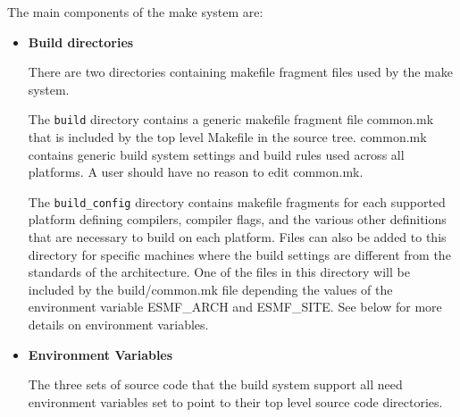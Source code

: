 The main components of the make system are:
\begin{itemize}
\item{{\bf Build directories}}

There are two directories containing makefile fragment files used by
the make system.  

The {\tt build} directory contains a generic makefile fragment file
common.mk that is included by the top level Makefile in the source
tree.  common.mk contains generic build system settings and build
rules used across all platforms.  A user should have no reason to edit
common.mk.

The {\tt build\_config} directory contains makefile fragments for each
supported platform defining compilers, compiler flags, and the various
other definitions that are necessary to build on each platform.  Files
can also be added to this directory for specific machines where the
build settings are different from the standards of the architecture.
One of the files in this directory will be included by the
build/common.mk file depending the values of the environment variable
ESMF\_ARCH and ESMF\_SITE.  See below for more details on environment
variables.

\item{{\bf Environment Variables}}

The three sets of source code that the build system support all need
environment variables set to point to their top level source code
directories. 

\end{itemize}

